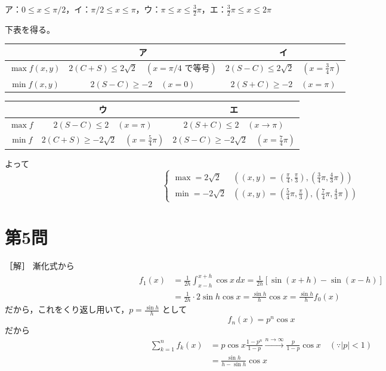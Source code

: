 \documentclass[../main.tex]{subfiles}
\begin{document}
ア：$0 \le x \le \pi/2$，イ：$\pi/2 \le x \le \pi$，ウ：$\pi \le x \le \frac{3}{2}\pi$，エ：$\frac{3}{2}\pi \le x \le 2\pi$

下表を得る。

\begin{center}
  \begin{tabular}{|c|c|c|}
    \hline
    & ア & イ \\
    \hline
    $\max f(x,y)$ & $2(C+S) \le 2\sqrt{2} \quad (x=\pi/4 \text{ で等号})$ & $2(S-C) \le 2\sqrt{2} \quad (x=\frac{3}{4}\pi)$ \\
    \hline
    $\min f(x,y)$ & $2(S-C) \ge -2 \quad (x=0)$ & $2(S+C) \ge -2 \quad (x=\pi)$ \\
    \hline
  \end{tabular}

  \medskip

  \begin{tabular}{|c|c|c|}
    \hline
    & ウ & エ \\
    \hline
    $\max f$ & $2(S-C) \le 2 \quad (x=\pi)$ & $2(S+C) \le 2 \quad (x \to \pi)$ \\
    \hline
    $\min f$ & $2(C+S) \ge -2\sqrt{2} \quad (x=\frac{5}{4}\pi)$ & $2(S-C) \ge -2\sqrt{2} \quad (x=\frac{7}{4}\pi)$ \\
    \hline
  \end{tabular}
\end{center}

よって
\[
  \begin{cases}
    \max = 2\sqrt{2} & \left( (x,y) = \left(\frac{\pi}{4}, \frac{\pi}{3}\right), \left(\frac{3}{4}\pi, \frac{4}{3}\pi\right) \right) \\[1ex]
    \min = -2\sqrt{2} & \left( (x,y) = \left(\frac{5}{4}\pi, \frac{\pi}{3}\right), \left(\frac{7}{4}\pi, \frac{4}{3}\pi\right) \right)
  \end{cases}
\]

\newpage

\section*{第5問}

［解］ 漸化式から
\begin{align*}
  f_1(x) &= \frac{1}{2h} \int_{x-h}^{x+h} \cos x \, dx = \frac{1}{2h} [\sin(x+h) - \sin(x-h)] \\
  &= \frac{1}{2h} \cdot 2\sin h \cos x = \frac{\sin h}{h} \cos x = \frac{\sin h}{h} f_0(x)
\end{align*}
だから，これをくり返し用いて，$p = \frac{\sin h}{h}$ として
\[
  f_n(x) = p^n \cos x
\]
だから
\begin{align*}
  \sum_{k=1}^n f_k(x) &= p \cos x \frac{1 - p^n}{1 - p} \xrightarrow{n \to \infty} \frac{p}{1 - p} \cos x \quad (\because |p| < 1) \\
  &= \frac{\sin h}{h - \sin h} \cos x
\end{align*}
\end{document}
